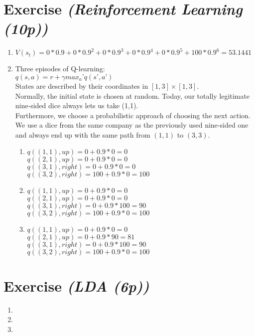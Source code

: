 \documentclass{article}
\begin{document}
\section{Exercise \textit{(Reinforcement Learning (10p))}}
\begin{enumerate}
    \item $V(s_t) = 0*0.9+0*0.9^2+0*0.9^3+0*0.9^4+0*0.9^5+100*0.9^6 = 53.1441 $
    \item Three episodes of Q-learning:\\
        $q(s,a) =  r + \gamma max_a’ q(s’,a’)$\\
        States are described by their coordinates in $[1,3] \times [1,3]$.\\
        Normally, the initial state is chosen at random. Today, our totally
        legitimate nine-sided dice always lets us take (1,1).\\
        Furthermore, we choose a probabilistic approach of choosing the next
        action. We use a dice from the same company as the previously used
        nine-sided one and always end up with the same path from $(1,1)$ to
        $(3,3)$.
        \begin{enumerate}
            \item
             $q((1,1),up) = 0 + 0.9*0 = 0$\\
             $q((2,1),up) = 0 + 0.9*0 = 0$\\
             $q((3,1),right) = 0 + 0.9*0 = 0$\\
             $q((3,2),right) = 100 + 0.9*0 = 100$\\
         \item
             $q((1,1),up) = 0 + 0.9*0 = 0$\\
             $q((2,1),up) = 0 + 0.9*0 = 0$\\
             $q((3,1),right) = 0 + 0.9*100 = 90$\\
             $q((3,2),right) = 100 + 0.9*0 = 100$\\
         \item
             $q((1,1),up) = 0 + 0.9*0 = 0$\\
             $q((2,1),up) = 0 + 0.9*90 = 81$\\
             $q((3,1),right) = 0 + 0.9*100 = 90$\\
             $q((3,2),right) = 100 + 0.9*0 = 100$\\
        \end{enumerate}
\end{enumerate}

\section{Exercise \textit{(LDA (6p))}}
\begin{enumerate}
    \item
    \item
    \item
\end{enumerate}
\end{document}
